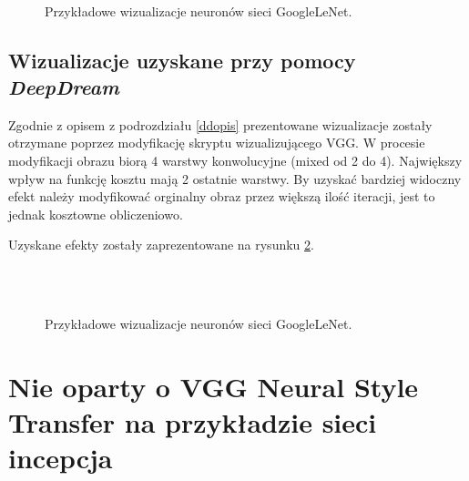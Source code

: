 \begin{figure}
~
\label{fig:incOtherVis}
\caption{Przykładowe wizualizacje neuronów sieci GoogleLeNet.}
\end{figure}

\subsection{Wizualizacje uzyskane przy pomocy \textit{DeepDream}}
Zgodnie z opisem z podrozdziału \ref{ddopis} prezentowane wizualizacje zostały otrzymane poprzez modyfikację skryptu wizualizującego VGG. W procesie modyfikacji obrazu biorą 4 warstwy konwolucyjne (mixed od 2 do 4). Największy wpływ na funkcję kosztu mają 2 ostatnie warstwy. By uzyskać bardziej widoczny efekt należy modyfikować orginalny obraz przez większą ilość iteracji, jest to jednak kosztowne obliczeniowo.

Uzyskane efekty zostały zaprezentowane na rysunku \ref{fig:deepdream}.

\begin{figure}
~
\\
~
\label{fig:deepdream}
\caption{Przykładowe wizualizacje neuronów sieci GoogleLeNet.}
\end{figure}

\section{Nie oparty o VGG Neural Style Transfer na przykładzie sieci incepcja}
